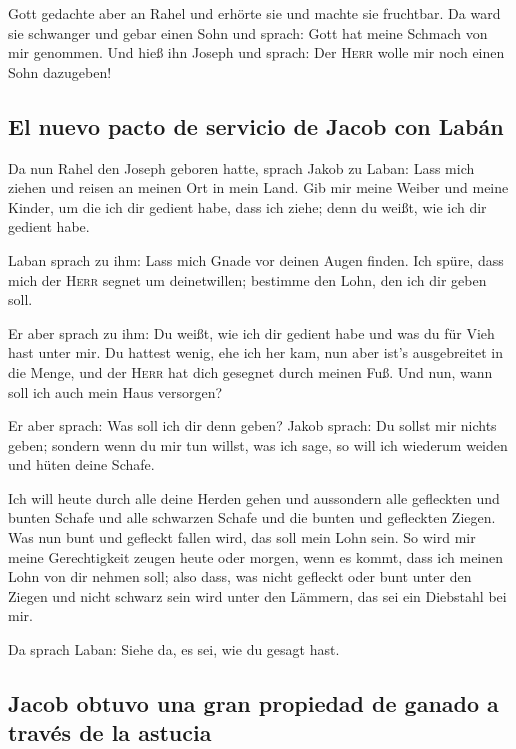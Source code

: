  Gott gedachte aber an Rahel und erhörte sie und machte
sie fruchtbar.  Da ward sie schwanger und gebar einen
Sohn und sprach: Gott hat meine Schmach von mir genommen.
 Und hieß ihn Joseph und sprach: Der \textsc{Herr} wolle
mir noch einen Sohn dazugeben!

\hypertarget{el-nuevo-pacto-de-servicio-de-jacob-con-labuxe1n}{%
\subsection{El nuevo pacto de servicio de Jacob con
Labán}\label{el-nuevo-pacto-de-servicio-de-jacob-con-labuxe1n}}

 Da nun Rahel den Joseph geboren hatte, sprach Jakob zu
Laban: Lass mich ziehen und reisen an meinen Ort in mein Land.
 Gib mir meine Weiber und meine Kinder, um die ich dir
gedient habe, dass ich ziehe; denn du weißt, wie ich dir gedient habe.

 Laban sprach zu ihm: Lass mich Gnade vor deinen Augen
finden. Ich spüre, dass mich der \textsc{Herr} segnet um deinetwillen;
 bestimme den Lohn, den ich dir geben soll.

 Er aber sprach zu ihm: Du weißt, wie ich dir gedient
habe und was du für Vieh hast unter mir.  Du hattest
wenig, ehe ich her kam, nun aber ist's ausgebreitet in die Menge, und
der \textsc{Herr} hat dich gesegnet durch meinen Fuß. Und nun, wann soll
ich auch mein Haus versorgen?

 Er aber sprach: Was soll ich dir denn geben? Jakob
sprach: Du sollst mir nichts geben; sondern wenn du mir tun willst, was
ich sage, so will ich wiederum weiden und hüten deine Schafe.

 Ich will heute durch alle deine Herden gehen und
aussondern alle gefleckten und bunten Schafe und alle schwarzen Schafe
und die bunten und gefleckten Ziegen. Was nun bunt und gefleckt fallen
wird, das soll mein Lohn sein.  So wird mir meine
Gerechtigkeit zeugen heute oder morgen, wenn es kommt, dass ich meinen
Lohn von dir nehmen soll; also dass, was nicht gefleckt oder bunt unter
den Ziegen und nicht schwarz sein wird unter den Lämmern, das sei ein
Diebstahl bei mir.

 Da sprach Laban: Siehe da, es sei, wie du gesagt hast.

\hypertarget{jacob-obtuvo-una-gran-propiedad-de-ganado-a-travuxe9s-de-la-astucia}{%
\subsection{Jacob obtuvo una gran propiedad de ganado a través de la
astucia}\label{jacob-obtuvo-una-gran-propiedad-de-ganado-a-travuxe9s-de-la-astucia}}

